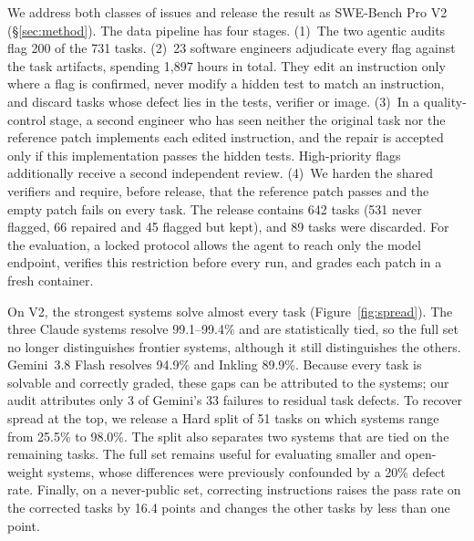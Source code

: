 We address both classes of issues and release the result as SWE-Bench Pro V2 (\S\ref{sec:method}). The data pipeline has four stages. (1)~The two agentic audits flag 200 of the 731 tasks. (2)~23 software engineers adjudicate every flag against the task artifacts, spending 1{,}897 hours in total. They edit an instruction only where a flag is confirmed, never modify a hidden test to match an instruction, and discard tasks whose defect lies in the tests, verifier or image. (3)~In a quality-control stage, a second engineer who has seen neither the original task nor the reference patch implements each edited instruction, and the repair is accepted only if this implementation passes the hidden tests. High-priority flags additionally receive a second independent review. (4)~We harden the shared verifiers and require, before release, that the reference patch passes and the empty patch fails on every task. The release contains 642 tasks (531 never flagged, 66 repaired and 45 flagged but kept), and 89 tasks were discarded. For the evaluation, a locked protocol allows the agent to reach only the model endpoint, verifies this restriction before every run, and grades each patch in a fresh container.

On V2, the strongest systems solve almost every task (Figure~\ref{fig:spread}). The three Claude systems resolve 99.1--99.4\% and are statistically tied, so the full set no longer distinguishes frontier systems, although it still distinguishes the others. Gemini~3.8 Flash resolves 94.9\% and Inkling 89.9\%. Because every task is solvable and correctly graded, these gaps can be attributed to the systems; our audit attributes only 3 of Gemini's 33 failures to residual task defects. To recover spread at the top, we release a Hard split of 51 tasks on which systems range from 25.5\% to 98.0\%. The split also separates two systems that are tied on the remaining tasks. The full set remains useful for evaluating smaller and open-weight systems, whose differences were previously confounded by a 20\% defect rate. Finally, on a never-public set, correcting instructions raises the pass rate on the corrected tasks by 16.4 points and changes the other tasks by less than one point.

